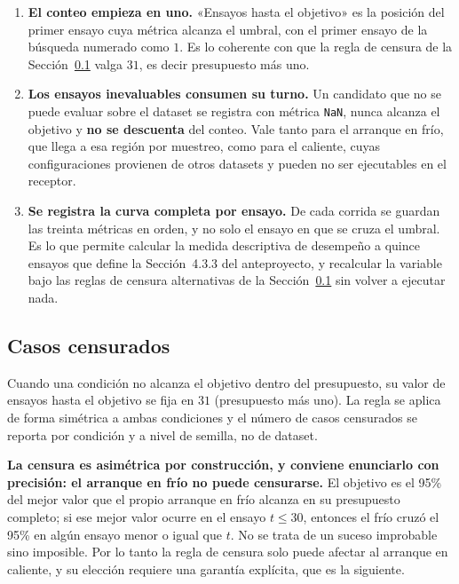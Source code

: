 \documentclass[11pt,letterpaper]{article}
\begin{document}
\begin{enumerate}
  \item \textbf{El conteo empieza en uno.} «Ensayos hasta el objetivo» es la
        posición del primer ensayo cuya métrica alcanza el umbral, con el primer
        ensayo de la búsqueda numerado como $1$. Es lo coherente con que la regla
        de censura de la Sección~\ref{sec:censura} valga $31$, es decir
        presupuesto más uno.

  \item \textbf{Los ensayos inevaluables consumen su turno.} Un candidato que no
        se puede evaluar sobre el dataset se registra con métrica \texttt{NaN},
        nunca alcanza el objetivo y \textbf{no se descuenta} del conteo. Vale
        tanto para el arranque en frío, que llega a esa región por muestreo, como
        para el caliente, cuyas configuraciones provienen de otros datasets y
        pueden no ser ejecutables en el receptor.

  \item \textbf{Se registra la curva completa por ensayo.} De cada corrida se
        guardan las treinta métricas en orden, y no solo el ensayo en que se
        cruza el umbral. Es lo que permite calcular la medida descriptiva de
        desempeño a quince ensayos que define la Sección~4.3.3 del anteproyecto,
        y recalcular la variable bajo las reglas de censura alternativas de la
        Sección~\ref{sec:censura} sin volver a ejecutar nada.
\end{enumerate}

\subsection{Casos censurados}
\label{sec:censura}

Cuando una condición no alcanza el objetivo dentro del presupuesto, su valor de
ensayos hasta el objetivo se fija en $31$ (presupuesto más uno). La regla se
aplica de forma simétrica a ambas condiciones y el número de casos censurados se
reporta por condición y a nivel de semilla, no de dataset.

\textbf{La censura es asimétrica por construcción, y conviene enunciarlo con
precisión: el arranque en frío no puede censurarse.} El objetivo es el 95\% del
mejor valor que el propio arranque en frío alcanza en su presupuesto completo; si
ese mejor valor ocurre en el ensayo $t \leq 30$, entonces el frío cruzó el 95\%
en algún ensayo menor o igual que $t$. No se trata de un suceso improbable sino
imposible. Por lo tanto la regla de censura solo puede afectar al arranque en
caliente, y su elección requiere una garantía explícita, que es la siguiente.
\end{document}
